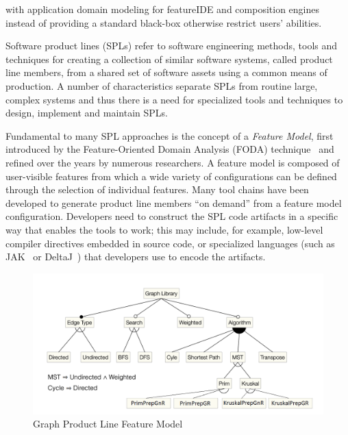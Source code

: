 with application domain modeling %
for featureIDE and composition engines %
instead of providing a standard black-box %
otherwise restrict users' abilities.

Software product lines (SPLs) refer to software engineering methods,
tools and techniques for creating a collection of similar software
systems, called product line members, from a shared set of software
assets using a common means of production. A number of characteristics
separate SPLs from routine large, complex systems and thus there is a
need for specialized tools and techniques to design, implement and
maintain SPLs.

Fundamental to many SPL approaches is the concept of a \textit{Feature
Model}, first introduced by the Feature-Oriented Domain Analysis (FODA)
technique~\cite{Kang1990} and refined over the years by numerous
researchers. A feature model is composed of user-visible features from
which a wide variety of configurations can be defined through the
selection of individual features. Many tool chains have been developed
to generate product line members ``on demand'' from a feature model
configuration. Developers need to construct the SPL code artifacts in a
specific way that enables the tools to work; this may include, for
example, low-level compiler directives embedded in source code, or
specialized languages (such as JAK~\cite{Batory2004FeatureorientedPA} or
DeltaJ~\cite{Schaefer:2010:DPS:1885639.1885647}) that developers use to
encode the artifacts.


\begin{figure} 
  \includegraphics[scale=0.25]{gpl2.png} 
  \caption{Graph Product Line Feature Model} 
  \label{fig:feature-model} 
\end{figure}

